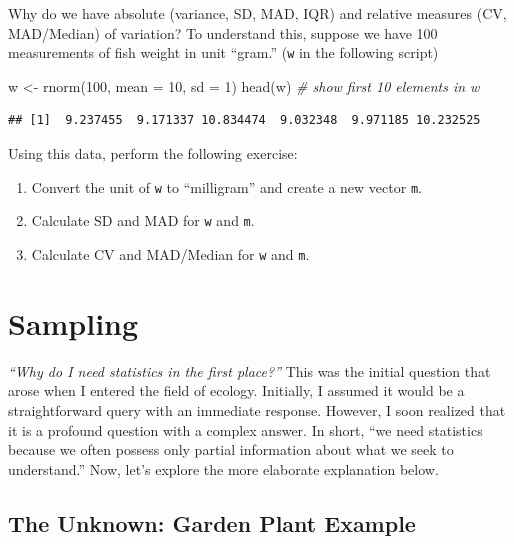 \documentclass[
]{article}
\newenvironment{Shaded}{\begin{snugshade}}{\end{snugshade}}
\newcommand{\AttributeTok}[1]{\textcolor[rgb]{0.77,0.63,0.00}{#1}}
\newcommand{\CommentTok}[1]{\textcolor[rgb]{0.56,0.35,0.01}{\textit{#1}}}
\newcommand{\DecValTok}[1]{\textcolor[rgb]{0.00,0.00,0.81}{#1}}
\newcommand{\FunctionTok}[1]{\textcolor[rgb]{0.00,0.00,0.00}{#1}}
\newcommand{\NormalTok}[1]{#1}
\newcommand{\OtherTok}[1]{\textcolor[rgb]{0.56,0.35,0.01}{#1}}
\begin{document}
Why do we have absolute (variance, SD, MAD, IQR) and relative measures (CV, MAD/Median) of variation? To understand this, suppose we have 100 measurements of fish weight in unit ``gram.'' (\texttt{w} in the following script)

\begin{Shaded}
\begin{Highlighting}[]
\NormalTok{w }\OtherTok{\textless{}{-}} \FunctionTok{rnorm}\NormalTok{(}\DecValTok{100}\NormalTok{, }\AttributeTok{mean =} \DecValTok{10}\NormalTok{, }\AttributeTok{sd =} \DecValTok{1}\NormalTok{)}
\FunctionTok{head}\NormalTok{(w) }\CommentTok{\# show first 10 elements in w}
\end{Highlighting}
\end{Shaded}

\begin{verbatim}
## [1]  9.237455  9.171337 10.834474  9.032348  9.971185 10.232525
\end{verbatim}

Using this data, perform the following exercise:

\begin{enumerate}
\def\labelenumi{\arabic{enumi}.}
\item
  Convert the unit of \texttt{w} to ``milligram'' and create a new vector \texttt{m}.
\item
  Calculate SD and MAD for \texttt{w} and \texttt{m}.
\item
  Calculate CV and MAD/Median for \texttt{w} and \texttt{m}.
\end{enumerate}

\hypertarget{sampling}{%
\section{Sampling}\label{sampling}}

\emph{``Why do I need statistics in the first place?''} This was the initial question that arose when I entered the field of ecology. Initially, I assumed it would be a straightforward query with an immediate response. However, I soon realized that it is a profound question with a complex answer. In short, ``we need statistics because we often possess only partial information about what we seek to understand.'' Now, let's explore the more elaborate explanation below.

\hypertarget{the-unknown-garden-plant-example}{%
\subsection{The Unknown: Garden Plant Example}\label{the-unknown-garden-plant-example}}
\end{document}
